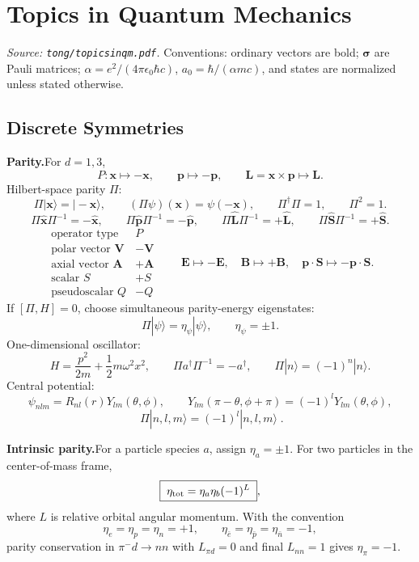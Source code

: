 \section{Topics in Quantum Mechanics}
\label{sec:topics-quantum-mechanics}

\noindent\emph{Source: \texttt{tong/topicsinqm.pdf}.}
Conventions: ordinary vectors are bold; $\bm{\sigma}$ are Pauli matrices;
$\alpha=e^2/(4\pi\epsilon_0\hbar c)$, $a_0=\hbar/(\alpha mc)$, and
states are normalized unless stated otherwise.

\subsection{Discrete Symmetries}

\noindent\textbf{Parity.}\quad For $d=1,3$,
\[
P:\mathbf x\mapsto-\mathbf x,\qquad \mathbf p\mapsto-\mathbf p,
\qquad \mathbf L=\mathbf x\times\mathbf p\mapsto\mathbf L.
\]
Hilbert-space parity $\Pi$:
\[
\Pi|\mathbf x\rangle=|-\mathbf x\rangle,\qquad
(\Pi\psi)(\mathbf x)=\psi(-\mathbf x),\qquad
\Pi^\dagger\Pi=1,\qquad \Pi^2=1.
\]
\[
\Pi\hat{\mathbf x}\Pi^{-1}=-\hat{\mathbf x},\qquad
\Pi\hat{\mathbf p}\Pi^{-1}=-\hat{\mathbf p},\qquad
\Pi\hat{\mathbf L}\Pi^{-1}=+\hat{\mathbf L},\qquad
\Pi\hat{\mathbf S}\Pi^{-1}=+\hat{\mathbf S}.
\]
\[
\begin{array}{c|c}
\text{operator type} & P \\\hline
\text{polar vector } \mathbf V & -\mathbf V\\
\text{axial vector } \mathbf A & +\mathbf A\\
\text{scalar } S & +S\\
\text{pseudoscalar } Q & -Q
\end{array}
\qquad
\mathbf E\mapsto-\mathbf E,\quad
\mathbf B\mapsto+\mathbf B,\quad
\mathbf p\cdot\mathbf S\mapsto-\mathbf p\cdot\mathbf S.
\]
If $[\Pi,H]=0$, choose simultaneous parity-energy eigenstates:
\[
\Pi|\psi\rangle=\eta_\psi|\psi\rangle,\qquad \eta_\psi=\pm1.
\]
One-dimensional oscillator:
\[
H=\frac{p^2}{2m}+\frac12m\omega^2x^2,\qquad
\Pi a^\dagger\Pi^{-1}=-a^\dagger,\qquad
\Pi|n\rangle=(-1)^n|n\rangle.
\]
Central potential:
\[
\psi_{nlm}=R_{nl}(r)Y_{lm}(\theta,\phi),\qquad
Y_{lm}(\pi-\theta,\phi+\pi)=(-1)^lY_{lm}(\theta,\phi),
\]
\[
\boxed{\;\Pi|n,l,m\rangle=(-1)^l|n,l,m\rangle\;}.
\]

\noindent\textbf{Intrinsic parity.}\quad For a particle species $a$, assign
$\eta_a=\pm1$. For two particles in the center-of-mass frame,
\[
\boxed{\;\eta_{\rm tot}=\eta_a\eta_b(-1)^L\;},
\]
where $L$ is relative orbital angular momentum. With the convention
\[
\eta_e=\eta_p=\eta_n=+1,\qquad
\eta_{\bar e}=\eta_{\bar p}=\eta_{\bar n}=-1,
\]
parity conservation in $\pi^-d\to nn$ with $L_{\pi d}=0$ and final $L_{nn}=1$
gives $\eta_\pi=-1$.

